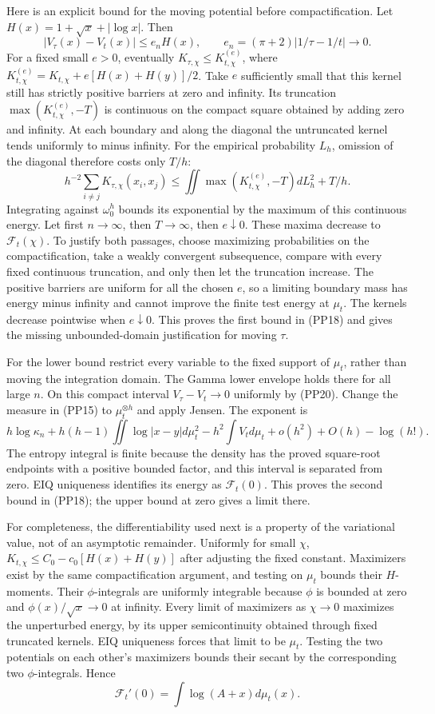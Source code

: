 \documentclass[10pt]{article}
\begin{document}
Here is an explicit bound for the moving potential before compactification. Let \(H(x)=1+\sqrt x+|\log x|\). Then \[
|V_\tau(x)-V_t(x)|\le e_nH(x),
\qquad e_n=(\pi+2)|1/\tau-1/t|\longrightarrow0.
\tag{PP20}
\] For a fixed small \(e>0\), eventually \(K_{\tau,\chi}\le K_{t,\chi}^{(e)}\), where \(K_{t,\chi}^{(e)}=K_{t,\chi}+e[H(x)+H(y)]/2\). Take \(e\) sufficiently small that this kernel still has strictly positive barriers at zero and infinity. Its truncation \(\max(K_{t,\chi}^{(e)},-T)\) is continuous on the compact square obtained by adding zero and infinity. At each boundary and along the diagonal the untruncated kernel tends uniformly to minus infinity. For the empirical probability \(L_h\), omission of the diagonal therefore costs only \(T/h\): \[
h^{-2}\sum_{i\ne j}K_{\tau,\chi}(x_i,x_j)
\le\iint\max(K_{t,\chi}^{(e)},-T)dL_h^2+T/h.
\] Integrating against \(\omega_0^h\) bounds its exponential by the maximum of this continuous energy. Let first \(n\to\infty\), then \(T\to\infty\), then \(e\downarrow0\). These maxima decrease to \(\mathcal F_t(\chi)\). To justify both passages, choose maximizing probabilities on the compactification, take a weakly convergent subsequence, compare with every fixed continuous truncation, and only then let the truncation increase. The positive barriers are uniform for all the chosen \(e\), so a limiting boundary mass has energy minus infinity and cannot improve the finite test energy at \(\mu_t\). The kernels decrease pointwise when \(e\downarrow0\). This proves the first bound in (PP18) and gives the missing unbounded-domain justification for moving \(\tau\).

For the lower bound restrict every variable to the fixed support of \(\mu_t\), rather than moving the integration domain. The Gamma lower envelope holds there for all large \(n\). On this compact interval \(V_\tau-V_t\to0\) uniformly by (PP20). Change the measure in (PP15) to \(\mu_t^{\otimes h}\) and apply Jensen. The exponent is \[
h\log\kappa_n+h(h-1)\iint\log|x-y|d\mu_t^2
-h^2\int V_t d\mu_t+o(h^2)+O(h)-\log(h!).
\] The entropy integral is finite because the density has the proved square-root endpoints with a positive bounded factor, and this interval is separated from zero. EIQ uniqueness identifies its energy as \(\mathcal F_t(0)\). This proves the second bound in (PP18); the upper bound at zero gives a limit there.

For completeness, the differentiability used next is a property of the variational value, not of an asymptotic remainder. Uniformly for small \(\chi\), \(K_{t,\chi}\le C_0-c_0[H(x)+H(y)]\) after adjusting the fixed constant. Maximizers exist by the same compactification argument, and testing on \(\mu_t\) bounds their \(H\)-moments. Their \(\phi\)-integrals are uniformly integrable because \(\phi\) is bounded at zero and \(\phi(x)/\sqrt x\to0\) at infinity. Every limit of maximizers as \(\chi\to0\) maximizes the unperturbed energy, by its upper semicontinuity obtained through fixed truncated kernels. EIQ uniqueness forces that limit to be \(\mu_t\). Testing the two potentials on each other's maximizers bounds their secant by the corresponding two \(\phi\)-integrals. Hence \[
\mathcal F_t'(0)=\int\log(A+x)d\mu_t(x).
\tag{PP21}
\]
\end{document}
